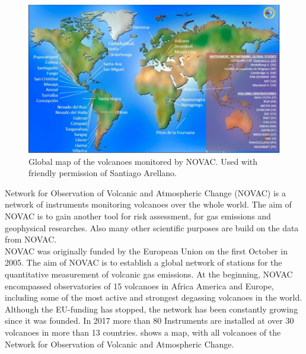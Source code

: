 

		\begin{figure}[h]
			\centering
			\includegraphics[width=0.8\linewidth]{Bilder/NOVAC2015}
			\caption{Global map of the volcanoes monitored by NOVAC. Used with friendly permission of Santiago Arellano.}
			\label{fig:novac2015}
		\end{figure}
		Network for Observation of Volcanic and Atmospheric Change (NOVAC) is a network of instruments monitoring volcanoes over the whole world. 
		The aim of NOVAC is to gain another tool for risk assessment, for gas emissions and geophysical researches. Also many other scientific purposes are build on the data from NOVAC.\\
		NOVAC was originally funded by the European Union on the first October in 2005. The aim of NOVAC is to  establish  a  global  
		network  of  stations  for  the  quantitative  measurement  of  volcanic gas  emissions. At the beginning, NOVAC encompassed observatories of 15 volcanoes in Africa America and Europe, including some of the most active and strongest degassing volcanoes in the world. Although the EU-funding has stopped, the network has been constantly growing since it was founded. In 2017 more than 80 Instruments are installed at over 30 volcanoes in more than 13 countries.
		 shows a map, with all volcanoes of the Network for Observation of Volcanic and Atmospheric Change.\\
		
